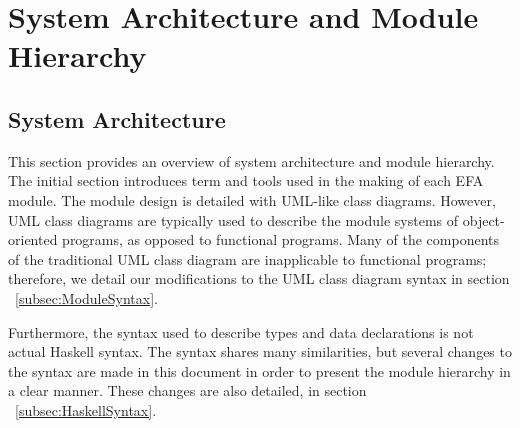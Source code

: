 \noindent
\section{System Architecture and Module Hierarchy}

\subsection{System Architecture}\label{SystemArch}

This section provides an overview of system architecture and module hierarchy. 
The 
initial section introduces term and tools used in the making of each EFA 
module. The module design is detailed with UML-like class diagrams. However, 
UML class diagrams are typically
used to describe the module systems of object-oriented programs, as opposed to
functional programs. Many of the components of the traditional UML class
diagram are inapplicable to functional programs; therefore, we detail our
modifications to the UML class diagram syntax in 
section ~\ref{subsec:ModuleSyntax}. 

Furthermore, the syntax used to describe types and data declarations is not
actual Haskell syntax. The syntax shares many similarities, but several changes
to the syntax are made in this document in order to present the module hierarchy
in a clear manner. These changes are also detailed, in 
section ~\ref{subsec:HaskellSyntax}. 

